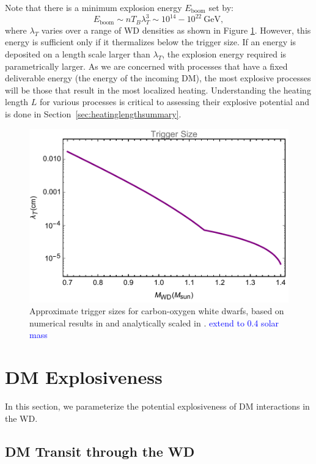 \documentclass[twocolumn,showpacs,preprintnumbers,amsmath,amssymb,prd]{revtex4}
\newcommand{\GeV}{\text{GeV}}
\begin{document}
Note that there is a minimum explosion energy $E_{\text{boom}}$ set by:
\begin{equation}
E_{\text{boom}} \sim n T_B \lambda_T^3 \sim 10^{14} - 10^{22} ~\GeV,
\end{equation}
where $\lambda_T$ varies over a range of WD densities as shown in Figure \ref{fig:triggersize}. However, this energy is sufficient only if it thermalizes below the trigger size.  If an energy is deposited on a length scale larger than $\lambda_T$, the explosion energy required is parametrically larger. As we are concerned with processes that have a fixed deliverable energy (the energy of the incoming DM), the most explosive processes will be those that result in the most localized heating. Understanding the heating length $L$ for various processes is critical to assessing their explosive potential and is done in Section~\ref{sec:heatinglengthsummary}.
\begin{figure}
\includegraphics[scale=.45]{triggerboom.pdf}
\caption{Approximate trigger sizes for carbon-oxygen white dwarfs, based on numerical results in \cite{Woosley} and analytically scaled in \cite{Graham:2015apa}.
\textcolor{blue}{extend to 0.4 solar mass}}
\label{fig:triggersize}
\end{figure}

\section{DM Explosiveness}
In this section, we parameterize the potential explosiveness of DM interactions in the WD.

\subsection{DM Transit through the WD}
\end{document}
